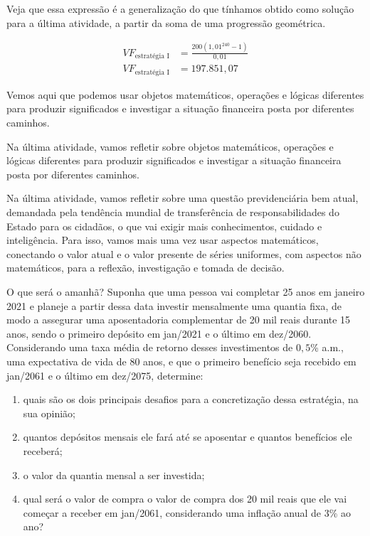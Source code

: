 Veja que essa expressão é a generalização do que tínhamos obtido como solução para a última atividade, a partir da soma de uma progressão geométrica.

\begin{align*}
VF_{\text{estratégia I}}&=\frac{200(1{,}01^{240}-1)}{0{,}01}\\
VF_{\text{estratégia I}}&=197.851{,}07
\end{align*}

Vemos aqui que podemos usar objetos matemáticos, operações e lógicas diferentes para produzir significados e investigar a situação financeira posta por diferentes caminhos.

Na última atividade, vamos refletir sobre objetos matemáticos, operações e lógicas diferentes para produzir significados e investigar a situação financeira posta por diferentes caminhos.

Na última atividade, vamos refletir sobre uma questão previdenciária bem atual, demandada pela tendência mundial de transferência de responsabilidades do Estado para os cidadãos, o que vai exigir mais conhecimentos, cuidado e inteligência. Para isso, vamos mais uma vez usar aspectos matemáticos, conectando o valor atual e o valor presente de séries uniformes, com aspectos não matemáticos, para a reflexão, investigação e tomada de decisão.


\begin{task}{O que será o amanhã?}
Suponha que uma pessoa vai completar 25 anos em janeiro 2021 e planeje a partir dessa data investir mensalmente uma quantia fixa, de modo a assegurar uma aposentadoria complementar de 20 mil reais durante 15 anos, sendo o primeiro depósito em jan/2021 e o último em dez/2060. Considerando uma taxa média de retorno desses investimentos de $0{,}5$\% a.m., uma expectativa de vida de 80 anos, e que o primeiro benefício seja recebido em jan/2061 e o último em dez/2075, determine:
\begin{enumerate}
  \item quais são os dois principais desafios para a concretização dessa estratégia, na sua opinião;
  \item quantos depósitos mensais ele fará até se aposentar e quantos benefícios ele receberá;
  \item o valor da quantia mensal a ser investida;
  \item qual será o valor de compra o valor de compra dos 20 mil reais que ele vai começar a receber em jan/2061, considerando uma inflação anual de $3$\% ao ano?
\end{enumerate}
\end{task}


